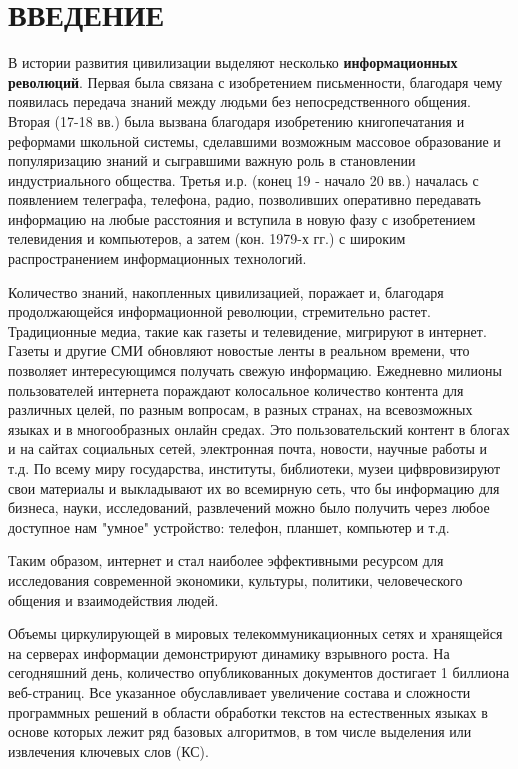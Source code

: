\chapter*{ВВЕДЕНИЕ}
В истории развития цивилизации выделяют несколько \textbf{информационных революций}.
Первая была связана с изобретением письменности, благодаря чему появилась передача знаний между людьми без непосредственного общения.
Вторая (17-18 вв.) была вызвана благодаря изобретению книгопечатания и реформами школьной системы, сделавшими возможным массовое образование и популяризацию знаний и сыгравшими важную роль в становлении индустриального общества.
Третья и.р. (конец 19 - начало 20 вв.) началась с появлением телеграфа, телефона, радио, позволивших оперативно передавать информацию на любые расстояния и вступила в новую фазу с изобретением телевидения и компьютеров, а затем (кон. 1979-х гг.) с широким распространением информационных технологий. \cite{16}

Количество знаний, накопленных цивилизацией, поражает и, благодаря продолжающейся информационной революции, стремительно растет.
Традиционные медиа, такие как газеты и телевидение, мигрируют в интернет.
Газеты и другие СМИ обновляют новостые ленты в реальном времени, что позволяет интересующимся получать свежую информацию.
Ежедневно милионы пользователей интернета пораждают колосальное количество контента для различных целей, по разным вопросам, в разных странах, на всевозможных языках и в многообразных онлайн средах.
Это пользовательский контент в блогах и на сайтах социальных сетей, электронная почта, новости, научные работы и т.д.
По всему миру государства, институты, библиотеки, музеи цифвровизируют свои материалы и выкладывают их во всемирную сеть, что бы информацию для бизнеса, науки, исследований, развлечений можно было получить через любое доступное нам "умное" устройство: телефон, планшет, компьютер и т.д. \cite{2}

Таким образом, интернет и стал наиболее эффективными ресурсом для исследования современной экономики, культуры, политики, человеческого общения и взаимодействия людей. \cite{2}

Объемы циркулирующей в мировых телекоммуникационных сетях и хранящейся на серверах информации демонстрируют динамику взрывного роста.
На сегодняшний день, количество опубликованных документов достигает 1 биллиона веб-страниц.
Все указанное обуславливает увеличение состава и сложности программных решений в области обработки текстов на естественных языках в основе которых лежит ряд базовых алгоритмов, в том числе выделения или извлечения ключевых слов (КС).

